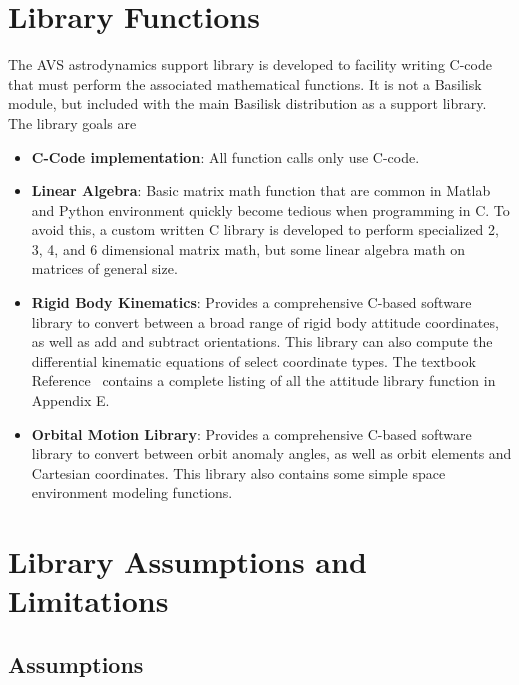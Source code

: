 
\section{Library Functions}

The AVS astrodynamics support library is developed to facility writing C-code that must perform the associated mathematical functions.  It is not a Basilisk module, but included with the main Basilisk distribution as a support library.  The library goals are

\begin{itemize}
	\item \textbf{C-Code implementation}: All function calls only use C-code.
	\item \textbf{Linear Algebra}: Basic matrix math function that are common in Matlab and Python environment quickly become tedious when programming in C.  To avoid this, a custom written C library is developed to perform specialized 2, 3, 4, and 6 dimensional matrix math, but some linear algebra math on matrices of general size.
	\item \textbf{Rigid Body Kinematics}: Provides a comprehensive C-based software library to convert between a broad range of rigid body attitude coordinates, as well as add and subtract orientations.  This library can also compute the differential kinematic equations of select coordinate types. The textbook  Reference~ contains a complete listing of all the attitude library function in Appendix E.
	\item \textbf{Orbital Motion Library}:  Provides a comprehensive C-based software library to convert between orbit anomaly angles, as well as orbit elements and Cartesian coordinates.  This library also contains some simple space environment modeling functions.

\end{itemize}



\section{Library Assumptions and Limitations}

\subsection{Assumptions}
